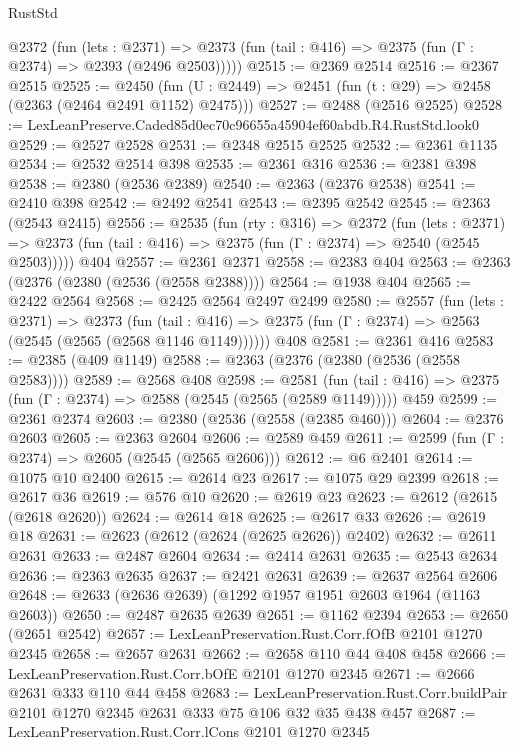 \begin{lexlean}{RustStd}
\begin{coremodule}
    @2372
      (fun (lets : @2371) =>
      @2373 (fun (tail : @416) => @2375 (fun (Γ : @2374) => @2393 (@2496 @2503)))))
@2515 := @2369 @2514
@2516 := @2367 @2515
@2525 := @2450 (fun (U : @2449) => @2451 (fun (t : @29) => @2458 (@2363 (@2464 @2491 @1152) @2475)))
@2527 := @2488 (@2516 @2525)
@2528 := LexLeanPreserve.Caded85d0ec70c96655a45904ef60abdb.R4.RustStd.look0
@2529 := @2527 @2528
@2531 := @2348 @2515 @2525
@2532 := @2361 @1135
@2534 := @2532 @2514 @398
@2535 := @2361 @316
@2536 := @2381 @398
@2538 := @2380 (@2536 @2389)
@2540 := @2363 (@2376 @2538)
@2541 := @2410 @398
@2542 := @2492 @2541
@2543 := @2395 @2542
@2545 := @2363 (@2543 @2415)
@2556 := @2535
    (fun (rty : @316) =>
    @2372
      (fun (lets : @2371) =>
      @2373 (fun (tail : @416) => @2375 (fun (Γ : @2374) => @2540 (@2545 @2503)))))
    @404
@2557 := @2361 @2371
@2558 := @2383 @404
@2563 := @2363 (@2376 (@2380 (@2536 (@2558 @2388))))
@2564 := @1938 @404
@2565 := @2422 @2564
@2568 := @2425 @2564 @2497 @2499
@2580 := @2557
    (fun (lets : @2371) =>
    @2373
      (fun (tail : @416) => @2375 (fun (Γ : @2374) => @2563 (@2545 (@2565 (@2568 @1146 @1149))))))
    @408
@2581 := @2361 @416
@2583 := @2385 (@409 @1149)
@2588 := @2363 (@2376 (@2380 (@2536 (@2558 @2583))))
@2589 := @2568 @408
@2598 := @2581
    (fun (tail : @416) => @2375 (fun (Γ : @2374) => @2588 (@2545 (@2565 (@2589 @1149)))))
    @459
@2599 := @2361 @2374
@2603 := @2380 (@2536 (@2558 (@2385 @460)))
@2604 := @2376 @2603
@2605 := @2363 @2604
@2606 := @2589 @459
@2611 := @2599 (fun (Γ : @2374) => @2605 (@2545 (@2565 @2606)))
@2612 := @6 @2401
@2614 := @1075 @10 @2400
@2615 := @2614 @23
@2617 := @1075 @29 @2399
@2618 := @2617 @36
@2619 := @576 @10
@2620 := @2619 @23
@2623 := @2612 (@2615 (@2618 @2620))
@2624 := @2614 @18
@2625 := @2617 @33
@2626 := @2619 @18
@2631 := @2623 (@2612 (@2624 (@2625 @2626)) @2402)
@2632 := @2611 @2631
@2633 := @2487 @2604
@2634 := @2414 @2631
@2635 := @2543 @2634
@2636 := @2363 @2635
@2637 := @2421 @2631
@2639 := @2637 @2564 @2606
@2648 := @2633 (@2636 @2639) (@1292 @1957 @1951 @2603 @1964 (@1163 @2603))
@2650 := @2487 @2635 @2639
@2651 := @1162 @2394
@2653 := @2650 (@2651 @2542)
@2657 := LexLeanPreservation.Rust.Corr.fOfB @2101 @1270 @2345
@2658 := @2657 @2631
@2662 := @2658 @110 @44 @408 @458
@2666 := LexLeanPreservation.Rust.Corr.bOfE @2101 @1270 @2345
@2671 := @2666 @2631 @333 @110 @44 @458
@2683 := LexLeanPreservation.Rust.Corr.buildPair
    @2101
    @1270
    @2345
    @2631
    @333
    @75
    @106
    @32
    @35
    @438
    @457
@2687 := LexLeanPreservation.Rust.Corr.lCons @2101 @1270 @2345

\end{coremodule}
\end{lexlean}
